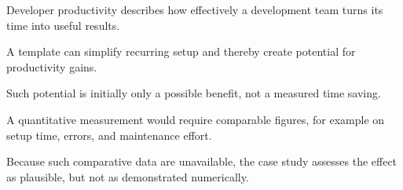 \begin{beginnerstatement}

Developer productivity describes how effectively a development team turns its
time into useful results.

A template can simplify recurring setup and thereby create potential for
productivity gains.

Such potential is initially only a possible benefit, not a measured time
saving.

A quantitative measurement would require comparable figures, for example on
setup time, errors, and maintenance effort.

Because such comparative data are unavailable, the case study assesses the
effect as plausible, but not as demonstrated numerically.

\end{beginnerstatement}
